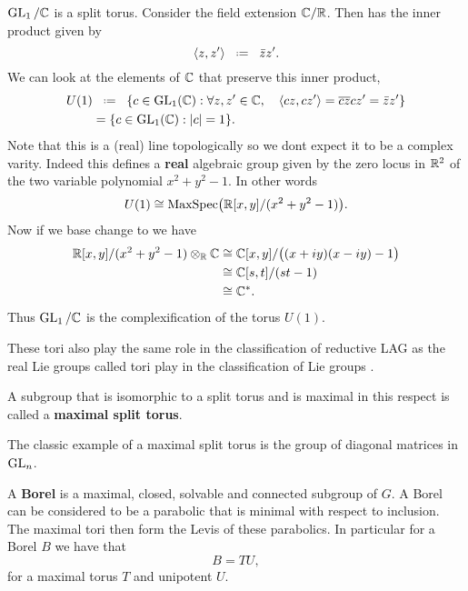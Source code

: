     \begin{example}
        \(\GL_1 /\C\) is a split torus. Consider the field extension \(\C/\R\). Then \C has the inner product given by 
        \[\inner{z, z'} \defeq \bar{z}z'.\]
        We can look at the elements of \(\C\) that preserve this inner product, 
        \begin{align*}
            U(1)&\defeq \{c\in \GL_1(\C) : \forall z,z'\in \C , \quad \inner{cz, cz'} = \overline{cz}cz' = \bar{z}z'\} \\
             &= \{c\in \GL_1(\C) : |c| = 1\}.
        \end{align*}
        Note that this is a (real) line topologically so we dont expect it to be a complex varity. Indeed this defines a \textbf{real} algebraic group given by the zero locus in \(\R^2\) of the two variable polynomial \(x^2 + y^2 - 1\). In other words
        \[ U(1) \cong \mathrm{MaxSpec}\big(\R[x,y]/(x^2 + y^2 - 1)\big) .\]
        Now if we base change to \C we have 
        \begin{align*}
            \R[x,y]/(x^2 + y^2 - 1) \tensor_\R \C &\cong \C[x,y]/\big((x+iy)(x-iy) -1 \big)\\
             &\cong \C[s,t]/(st -1) \\
             &\cong \C^\ast.
        \end{align*}
        Thus \(\GL_1 / \C\) is the complexification of the torus \(U(1)\).
    \end{example}
    
    \begin{remark}
        These tori also play the same role in the classification of reductive LAG as the real Lie groups called tori play in the classification of Lie groups \cite[Part III]{hallLieGroupsLie2015}.
    \end{remark}
    
    A subgroup that is isomorphic to a split torus and is maximal in this respect is called a \textbf{maximal split torus}. 
     \begin{example}
        The classic example of a maximal split torus is the group of diagonal matrices in \(\operatorname{GL}_n\).
     \end{example}

    A \textbf{Borel} is a maximal, closed, solvable and connected subgroup of \(G\). A Borel can be considered to be a parabolic that is minimal with respect to inclusion. The maximal tori then form the Levis of these parabolics. In particular for a Borel \(B\) we have that 
    \[B = TU,\]
    for a maximal torus \(T\) and unipotent \(U\).

